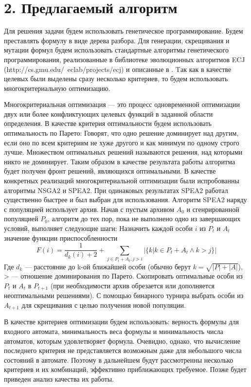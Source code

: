 \documentclass[12pt,fleqn]{article}
\begin{document}
\section{2. Предлагаемый алгоритм}

Для решения задачи будем использовать генетическое программирование\cite{kz1}. Будем преставлять формулу в виде дерева разбора.
Для генерации, скрещивания и мутации формул будем использовать стандартные алгоритмы генетического программирования,
реализованные в библиотеке эволюционных алгоритмов ECJ (http://cs.gmu.edu/~eclab/projects/ecj) и описанные в \cite{kz1,kz2}.
Tак как в качестве целевых были выделены сразу несколько критериев, то будем использовать многокритериальную оптимизацию.

Многокритериальная оптимизация --- это процесс одновременной оптимизации двух или более конфликтующих целевых функций
в заданной области определения. В качестве критерия оптимальности будем использовать оптимальность по Парето:
Говорят, что одно решение доминирует над другим, если оно по всем критериям не хуже другого и как минимум по одному
строго лучше. Множеством оптимальных решений называются решения, над которыми никто не доминирует. Таким образом
в качестве результата работы алгоритма будет получен фронт решений, являющихся оптимальными. В качестве конкретных
реализаций многокритериальной оптимизации были испробованны алгоритмы NSGA2\cite{nsga2} и SPEA2\cite{spea2}.
При одинаковых результатах SPEA2 работал существенно быстрее и был выбран для использования. Алгоритм SPEA2
наряду с популяцией использует архив. Начав с пустым архивом $A_0$ и сгенрированной популяцией $P_0$, алгоритм до
тех пор, пока не выполнено одно из завершающих условий, выполняет следующие шаги: Назначить каждой особи $i$ из $P_t$ и $A_t$
значение функции приспособленности
$$
F(i) = \frac{1}{d_k(i) + 2} + \sum_{j\in P_t + A_t, j > i}|\{k|k \in P_t + A_t \wedge k > j\}|
$$
Где $d_k$ --- расстояние до k-ой ближайшей особи (обычно берут $k = \sqrt{|P| + |A|}$), > --- отношение доминирования по Парето. Скопировать оптимальные
особи из $P_t$ и $A_t$ в $P_{t+1}$ (при необходимости архив обрезается или дополняется неоптимальными решениями).
С помощью бинарного турнира выбрать особи из $A_{t+1}$ для скрещивания с целью получения новой популяции. 

В качестве критериев оптимизации будем использовать: верность формулы для входного автомата, минимальность веса
формулы и минимальность числа автоматов, которым удовлетворяет формула. Очевидно, однако, что вычисление последнего
критерия не представляется возможным даже для небольшого числа состояний в автомате. Поэтому в дальнейшем будут
рассмотренны несколько критериев и их комбинаций, эффективно приближающих требуемое. Позже будет приведен
анализ качества их работы.
\end{document}
